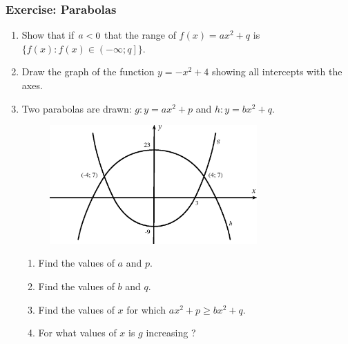             \subsubsection{Exercise:  Parabolas }
            \nopagebreak
          \label{m39345*id245690}\begin{enumerate}[noitemsep, label=\textbf{\arabic*}. ] 
            \label{m39345*uid130}\item Show that if $a<{}0$ that the range of $f\left(x\right)=a{x}^{2}+q$ is $\{f\left(x\right):f\left(x\right)\in \left(-\infty ;q\right]\}$.
        \label{m39345*uid131}\item Draw the graph of the function $y=-{x}^{2}+4$ showing all intercepts with the axes.
\label{m39345*uid132}\item Two parabolas are drawn: $g:y=a{x}^{2}+p$ and $h:y=b{x}^{2}+q$.
    \setcounter{subfigure}{0}
	\begin{figure}[H] %
    \begin{center}
    \label{m39345*id245918!!!underscore!!!media}\label{m39345*id245918!!!underscore!!!printimage}\includegraphics[width=300px]{col11306.imgs/m39345_MG10C11_020.png} %
      \vspace{2pt}
    \vspace{.1in}
    \end{center}
 \end{figure}       \label{m39345*id245925}\begin{enumerate}[noitemsep, label=\textbf{\alph*}. ] 
            \label{m39345*uid133}\item Find the values of $a$ and $p$.
\label{m39345*uid134}\item Find the values of $b$ and $q$.
\label{m39345*uid135}\item Find the values of $x$ for which $a{x}^{2}+p\ge b{x}^{2}+q$.
\label{m39345*uid136}\item For what values of $x$ is $g$ increasing ?
\end{enumerate}
                \end{enumerate}
